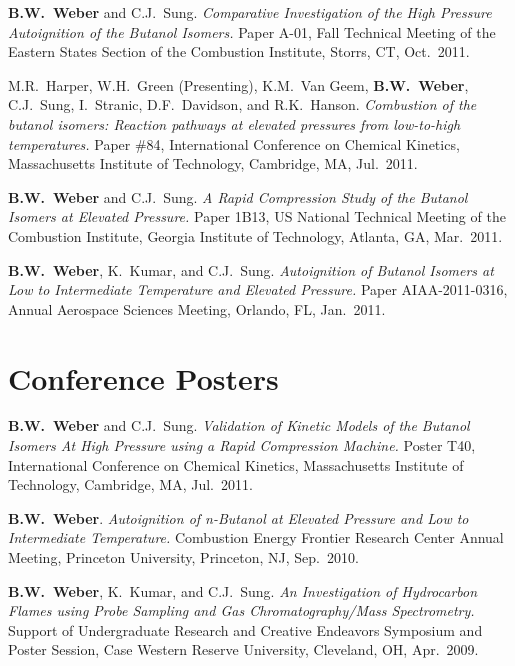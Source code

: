 \begin{bibmune}
\item \textbf{B.W.\ Weber} and C.J.\ Sung. \textit{Comparative
        Investigation of the High Pressure Autoignition of the Butanol
        Isomers.} Paper A-01, Fall Technical Meeting of the Eastern
        States Section of the Combustion Institute, Storrs, CT, Oct.\
        2011.

\item M.R.\ Harper, W.H.\ Green (Presenting), K.M.\ Van Geem,
        \textbf{B.W.\ Weber}, C.J.\ Sung, I.\ Stranic, D.F.\ Davidson,
        and R.K.\ Hanson. \textit{Combustion of the butanol isomers:
        Reaction pathways at elevated pressures from low-to-high
        temperatures.} Paper \#84, \ordinalnum{7} International
        Conference on Chemical Kinetics, Massachusetts Institute of
        Technology, Cambridge, MA, Jul.\ 2011.

\item \textbf{B.W.\ Weber} and C.J.\ Sung. \textit{A Rapid Compression
        Study of the Butanol Isomers at Elevated Pressure.} Paper 1B13,
        \ordinalnum{7}  US National Technical Meeting of the Combustion
        Institute, Georgia Institute of Technology, Atlanta, GA, Mar.\
        2011.

\item \textbf{B.W.\ Weber}, K.\ Kumar, and C.J.\ Sung.
        \textit{Autoignition of Butanol Isomers at Low to Intermediate
        Temperature and Elevated Pressure.} Paper AIAA-2011-0316,
        \ordinalnum{49}  Annual Aerospace Sciences Meeting,
        Orlando, FL, Jan.\ 2011.
\end{bibmune}

\section{{\sectionfont Conference Posters}}

\begin{bibmune}
\item \textbf{B.W.\ Weber} and C.J.\ Sung. \textit{Validation of
        Kinetic Models of the Butanol Isomers At High Pressure
        using a Rapid Compression Machine.} Poster T40,
        \ordinalnum{7} International Conference on Chemical Kinetics,
         Massachusetts Institute of Technology, Cambridge, MA,
         Jul.\ 2011.

\item \textbf{B.W.\ Weber}. \textit{Autoignition of n-Butanol at
        Elevated Pressure and Low to Intermediate Temperature.}
        \ordinalnum{1} Combustion Energy Frontier Research Center
        Annual Meeting, Princeton University, Princeton, NJ,
        Sep.\ 2010.

\item \textbf{B.W.\ Weber}, K.\ Kumar, and C.J.\ Sung. \textit{An
        Investigation of Hydrocarbon Flames using Probe Sampling and
        Gas Chromatography/Mass Spectrometry.} Support of Undergraduate
        Research and Creative Endeavors Symposium and Poster Session,
        Case Western Reserve University, Cleveland, OH, Apr.\ 2009.
\end{bibmune}

